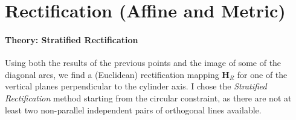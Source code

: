 \documentclass[a4paper,11pt]{article}
\newcommand{\matr}[1]{\bm{#1}}     %
\begin{document}
\section{Rectification (Affine and Metric)}

\paragraph{Theory: Stratified Rectification}
Using both the results of the previous points and the image of some of the diagonal arcs, we find a (Euclidean) rectification mapping $\matr{H}_R$ for one of the vertical planes perpendicular to the cylinder axis. I chose the \textit{Stratified Rectification} method starting from the circular constraint, as there are not at least two non-parallel independent pairs of orthogonal lines available.
\end{document}
